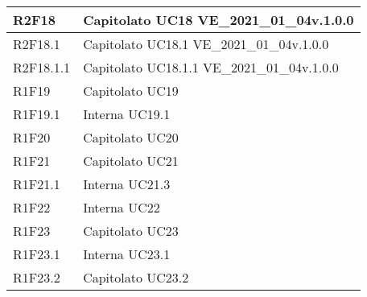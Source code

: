\begin{center}
\begin{longtable}{|p{22mm}|p{44mm}|}
R2F18 &
Capitolato \newline
UC18 \newline
VE\_2021\_01\_04v.1.0.0 \newline
\\
\hline

R2F18.1 &
Capitolato \newline
UC18.1 \newline
VE\_2021\_01\_04v.1.0.0 \newline
\\
\hline

R2F18.1.1 &
Capitolato \newline
UC18.1.1 \newline
VE\_2021\_01\_04v.1.0.0 \newline
\\
\hline

R1F19 &
Capitolato \newline
UC19 \newline
\\
\hline

R1F19.1 &
Interna \newline
UC19.1 \newline
\\
\hline

R1F20 &
Capitolato \newline
UC20 \newline
\\
\hline

R1F21 &
Capitolato \newline
UC21 \newline
\\
\hline

R1F21.1 &
Interna \newline
UC21.3 \newline
\\
\hline

R1F22 &
Interna \newline
UC22 \newline
\\
\hline

R1F23 &
Capitolato \newline
UC23 \newline
\\
\hline

R1F23.1 &
Interna \newline
UC23.1 \newline
\\
\hline

R1F23.2 &
Capitolato \newline
UC23.2 \newline
\\
\hline


\end{longtable}
\end{center}
